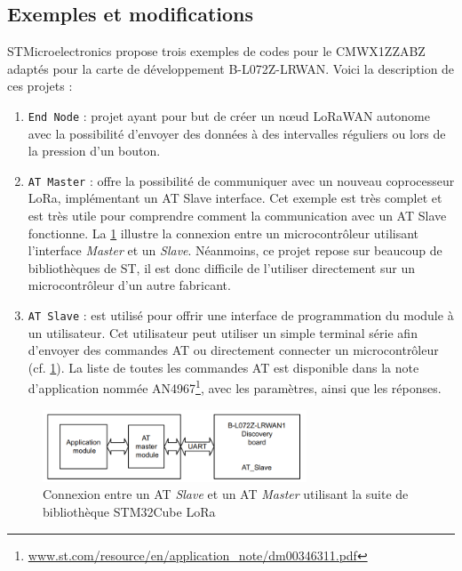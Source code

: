 \subsection{Exemples et modifications}
STMicroelectronics propose trois exemples de codes pour le CMWX1ZZABZ adaptés pour la carte de développement B-L072Z-LRWAN. Voici la description de ces projets : 
\begin{enumerate}
    \item \texttt{End Node} : projet ayant pour but de créer un n\oe ud LoRaWAN autonome avec la possibilité d'envoyer des données à des intervalles réguliers ou lors de la pression d'un bouton. 
    
    \item \texttt{AT Master} : offre la possibilité de communiquer avec un nouveau coprocesseur LoRa, implémentant un AT Slave interface. Cet exemple est très complet et est très utile pour comprendre comment la communication avec un AT Slave fonctionne. La \cref{fig-at_slave_master_connection} illustre la connexion entre un microcontrôleur utilisant l'interface \textit{Master} et un \textit{Slave}. Néanmoins, ce projet repose sur beaucoup de bibliothèques de ST, il est donc difficile de l'utiliser directement sur un microcontrôleur d'un autre fabricant.
    
    \item \texttt{AT Slave} : est utilisé pour offrir une interface de programmation du module à un utilisateur. Cet utilisateur peut utiliser un simple terminal série afin d'envoyer des commandes AT ou directement connecter un microcontrôleur (cf. \cref{fig-at_slave_master_connection}). La liste de toutes les commandes AT est disponible dans la note d'application nommée AN4967\footnote{\url{www.st.com/resource/en/application_note/dm00346311.pdf}}, avec les paramètres, ainsi que les réponses.
\end{enumerate}


\begin{figure}[ht!]
    \centering
    \includegraphics[width=0.7\textwidth]{Figures/Software/LoRaWAN/at_slave_master_connection.png}
    \caption{Connexion entre un AT \textit{Slave} et un AT \textit{Master} utilisant la suite de bibliothèque STM32Cube LoRa}
    \label{fig-at_slave_master_connection}
\end{figure}

